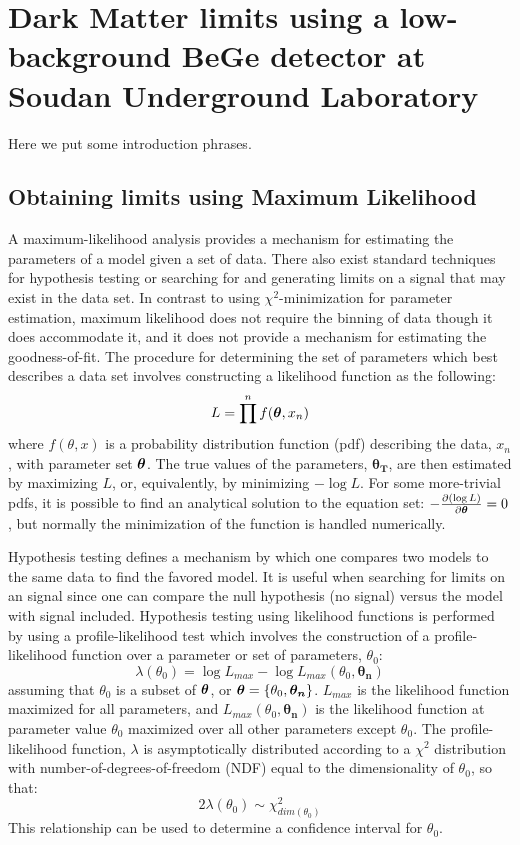 \section{Dark Matter limits using a low-background BeGe detector at Soud\-an Underground Laboratory} 
	Here we put some introduction phrases.
	
	\subsection{Obtaining limits using Maximum Likelihood}
	\label{sec:LimitsML}		

A maximum-likelihood analysis provides a mechanism for estimating the parameters of a model given a set of data.  There also exist standard techniques for hypothesis testing or searching for and generating limits on a signal that may exist in the data set.  In contrast to using $\chi^{2}$-minimization for parameter estimation, maximum likelihood does not require the binning of data though it does accommodate it, and it does not provide a mechanism for estimating the goodness-of-fit.  The procedure for determining the set of parameters which best describes a data set involves constructing a likelihood function as the following:
		\[
		L = \prod^{n} f({\boldsymbol{\theta}}, x_{n})
		\]
where $f(\theta, x)$ is a probability distribution function (pdf) describing the data, $x_{n}$, with parameter set $\boldsymbol{\theta}$.  The true values of the parameters, $\boldsymbol{\theta_{T}}$, are then estimated by maximizing $L$, or, equivalently, by minimizing $-\log L$.  For some more-trivial pdfs, it is possible to find an analytical solution to the equation set: $-\frac{\partial ( \log L )}{\partial\boldsymbol{\theta}} = 0$, but normally the minimization of the function is handled numerically.  

Hypothesis testing defines a mechanism by which one compares two models to the same data to find the favored model.  It is useful when searching for limits on an signal since one can compare the null hypothesis (no signal) versus the model with signal included.  Hypothesis testing using likelihood functions is performed by using a profile-likelihood test which involves the construction of a profile-likelihood function over a parameter or set of parameters, $\theta_{0}$:
		\[
		\lambda(\theta_{0}) = \log L_{max}  - \log L_{max}(\theta_{0}, \boldsymbol{\theta_{n}})
		\]
assuming that $\theta_{0}$ is a subset of $\boldsymbol{\theta}$, or $\boldsymbol{\theta} = \{\theta_{0}, \boldsymbol{\theta_{n}}\}$.  $L_{max}$ is the likelihood function maximized for all parameters, and $ L_{max}(\theta_{0}, \boldsymbol{\theta_{n}})$ is the likelihood function at parameter value $\theta_{0}$ maximized over all other parameters except $\theta_{0}$.  The profile-likelihood function, $\lambda$ is asymptotically distributed according to a $\chi^{2}$ distribution with number-of-degrees-of-freedom (NDF) equal to the dimensionality of $\theta_{0}$, so that:
		\[
		2 \lambda (\theta_{0}) \sim \chi^{2}_{dim(\theta_{0})}
		\]
  This relationship can be used to determine a confidence interval for $\theta_{0}$.		

